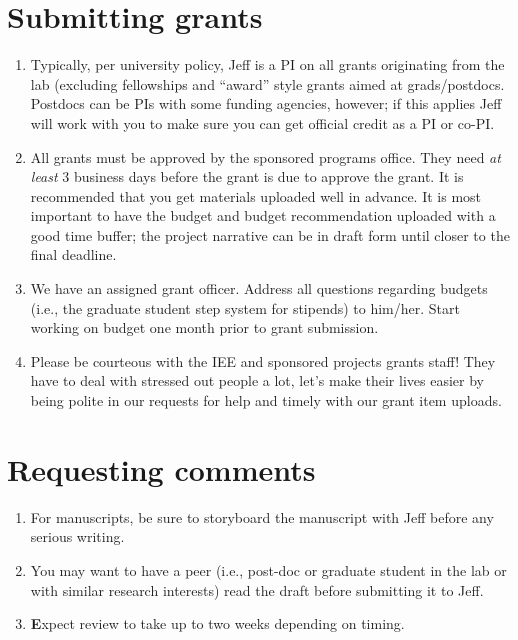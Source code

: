 \documentclass[12pt]{article}
\begin{document}
\section{Submitting grants}
\begin{enumerate}
\item Typically, per university policy, Jeff is a PI on all grants originating from
  the lab (excluding fellowships and ``award'' style grants aimed at grads/postdocs. Postdocs can be PIs with some funding agencies, however; if this applies Jeff will work with you to make sure you can get official credit as a PI or co-PI.
\item All grants must be approved by the sponsored programs office. They need \textit{at least} 3 business days before the grant is due to approve the grant. It is recommended that you get materials uploaded well in advance. It is most important to have the budget and budget recommendation uploaded with a good time buffer; the project narrative can be in draft form until closer to the final deadline.  
\item We have an assigned grant officer.  Address all questions regarding budgets (i.e., the graduate student step system for stipends) to him/her. Start working on budget one month prior to grant submission.
\item Please be courteous with the IEE and sponsored projects grants staff! They have to deal with stressed out people a lot, let's make their lives easier by being polite in our requests for help and timely with our grant item uploads.
\end{enumerate}

\section{Requesting comments}
\begin{enumerate}
\item For manuscripts, be sure to storyboard the manuscript with Jeff before any serious writing.
\item You may want to have a peer (i.e., post-doc or graduate student in the lab or with similar research interests) read the draft before submitting it to Jeff.
\item \textbf Expect review to take up to two weeks depending on timing.
\end{enumerate}
\end{document}
